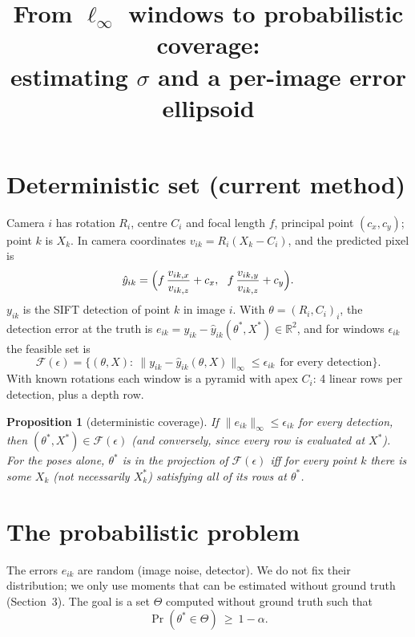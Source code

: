 \documentclass[11pt]{article}
\title{From $\ell_\infty$ windows to probabilistic coverage:\\ estimating $\sigma$ and a per-image error ellipsoid}
\date{}
\newtheorem{proposition}{Proposition}
\newcommand{\R}{\mathbb{R}}
\begin{document}
\maketitle

\section{Deterministic set (current method)}
Camera $i$ has rotation $R_i$, centre $C_i$ and focal length $f$, principal point $(c_x,c_y)$; point $k$ is $X_k$.
In camera coordinates $v_{ik}=R_i(X_k-C_i)$, and the predicted pixel is
\begin{equation}
  \hat y_{ik}=\Bigl(f\,\frac{v_{ik,x}}{v_{ik,z}}+c_x,\ \ f\,\frac{v_{ik,y}}{v_{ik,z}}+c_y\Bigr).
\end{equation}
$y_{ik}$ is the SIFT detection of point $k$ in image $i$. With $\theta=(R_i,C_i)_i$, the detection error at the truth is
$e_{ik}=y_{ik}-\hat y_{ik}(\theta^*,X^*)\in\R^2$, and for windows $\epsilon_{ik}$ the feasible set is
\begin{equation}
  \mathcal F(\epsilon)=\bigl\{(\theta,X):\ \|y_{ik}-\hat y_{ik}(\theta,X)\|_\infty\le\epsilon_{ik}\ \ \text{for every detection}\bigr\}.
\end{equation}
With known rotations each window is a pyramid with apex $C_i$: 4 linear rows per detection, plus a depth row.

\begin{proposition}[deterministic coverage]
If $\|e_{ik}\|_\infty\le\epsilon_{ik}$ for every detection, then $(\theta^*,X^*)\in\mathcal F(\epsilon)$ (and conversely,
since every row is evaluated at $X^*$). For the poses alone, $\theta^*$ is in the projection of $\mathcal F(\epsilon)$
iff for every point $k$ there is \emph{some} $X_k$ (not necessarily $X_k^*$) satisfying all of its rows at $\theta^*$.
\end{proposition}

\section{The probabilistic problem}
The errors $e_{ik}$ are random (image noise, detector). We do not fix their distribution; we only use moments that can be
estimated without ground truth (Section~3). The goal is a set $\Theta$ computed without ground truth such that
\begin{equation}
  \Pr(\theta^*\in\Theta)\ \ge\ 1-\alpha .
\end{equation}
\end{document}
